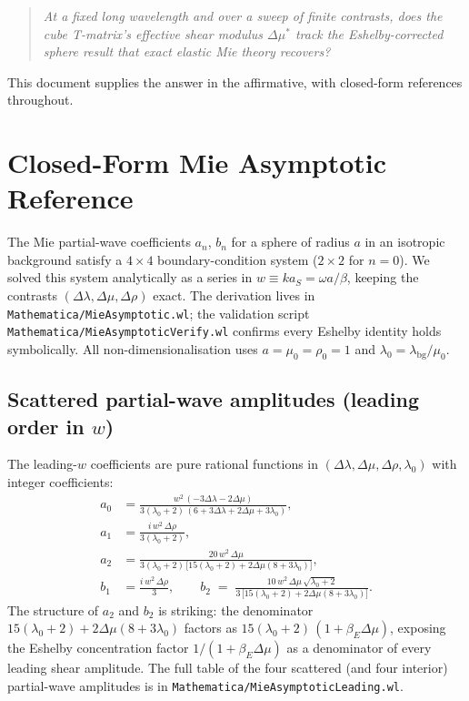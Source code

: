 \documentclass[11pt,a4paper]{article}
\newcommand{\D}{\Delta}
\newcommand{\code}[1]{\texttt{#1}}
\begin{document}
\begin{quote}
\itshape
At a fixed long wavelength and over a sweep of finite contrasts, does the
cube T-matrix's effective shear modulus $\D\mu^*$ track the
Eshelby-corrected sphere result that exact elastic Mie theory recovers?
\end{quote}

This document supplies the answer in the affirmative, with closed-form
references throughout.

\section{Closed-Form Mie Asymptotic Reference}
\label{sec:mie-asymptotic}

The Mie partial-wave coefficients $a_n$, $b_n$ for a sphere of radius $a$
in an isotropic background satisfy a $4\times4$ boundary-condition system
($2\times2$ for $n=0$).  We solved this system analytically as a series
in $w \equiv ka_S = \omega a/\beta$, keeping the contrasts
$(\D\lambda,\D\mu,\D\rho)$ exact.  The derivation lives in
\code{Mathematica/MieAsymptotic.wl}; the validation script
\code{Mathematica/MieAsymptoticVerify.wl} confirms every Eshelby
identity holds symbolically.  All non-dimensionalisation uses
$a=\mu_0=\rho_0=1$ and $\lambda_0=\lambda_{\mathrm{bg}}/\mu_0$.

\subsection{Scattered partial-wave amplitudes (leading order in $w$)}

The leading-$w$ coefficients are pure rational functions in
$(\D\lambda,\D\mu,\D\rho,\lambda_0)$ with integer coefficients:
\begin{align}
a_0 &= \frac{w^2 \, (-3\D\lambda - 2\D\mu)}
            {3(\lambda_0+2)\,(6+3\D\lambda+2\D\mu+3\lambda_0)}, \\[4pt]
a_1 &= \frac{i\,w^2 \, \D\rho}{3(\lambda_0+2)}, \\[4pt]
a_2 &= \frac{20\,w^2\,\D\mu}
            {3(\lambda_0+2)\,\bigl[15(\lambda_0+2)+2\D\mu(8+3\lambda_0)\bigr]}, \\[4pt]
b_1 &= \frac{i\,w^2\,\D\rho}{3}, \qquad
b_2 \;=\; \frac{10\,w^2\,\D\mu\,\sqrt{\lambda_0+2}}
              {3\,\bigl[15(\lambda_0+2)+2\D\mu(8+3\lambda_0)\bigr]}.
\end{align}
The structure of $a_2$ and $b_2$ is striking: the denominator
$15(\lambda_0+2)+2\D\mu(8+3\lambda_0)$ factors as
$15(\lambda_0+2)\,(1+\beta_E\D\mu)$, exposing the Eshelby concentration
factor $1/(1+\beta_E\D\mu)$ as a denominator of every leading shear
amplitude.  The full table of the four scattered (and four interior)
partial-wave amplitudes is in
\code{Mathematica/MieAsymptoticLeading.wl}.
\end{document}
